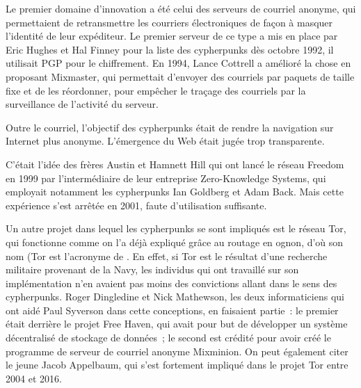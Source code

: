 Le premier domaine d'innovation a été celui des serveurs de courriel anonyme, qui permettaient de retransmettre les courriers électroniques de façon à masquer l'identité de leur expéditeur. Le premier serveur de ce type a mis en place par Eric Hughes et Hal Finney pour la liste des cypherpunks dès octobre 1992, il utilisait PGP pour le chiffrement. En 1994, Lance Cottrell a amélioré la chose en proposant Mixmaster, qui permettait d'envoyer des courriels par paquets de taille fixe et de les réordonner, pour empêcher le traçage des courriels par la surveillance de l'activité du serveur. %

Outre le courriel, l'objectif des cypherpunks était de rendre la navigation sur Internet plus anonyme. L'émergence du Web était jugée trop transparente.

C'était l'idée des frères Austin et Hamnett Hill qui ont lancé le réseau Freedom en 1999 par l'intermédiaire de leur entreprise Zero-Knowledge Systems, qui employait notamment les cypherpunks Ian Goldberg et Adam Back. Mais cette expérience s'est arrêtée en 2001, faute d'utilisation suffisante.

Un autre projet dans lequel les cypherpunks se sont impliqués est le réseau Tor, qui fonctionne comme on l'a déjà expliqué grâce au routage en ognon, d'où son nom (Tor est l'acronyme de . En effet, si Tor est le résultat d'une recherche militaire provenant de la Navy, les individus qui ont travaillé sur son implémentation n'en avaient pas moins des convictions allant dans le sens des cypherpunks. Roger Dingledine et Nick Mathewson, les deux informaticiens qui ont aidé Paul Syverson dans cette conceptions, en faisaient partie~: le premier était derrière le projet Free Haven, qui avait pour but de développer un système décentralisé de stockage de données~; le second est crédité pour avoir créé le programme de serveur de courriel anonyme Mixminion. On peut également citer le jeune Jacob Appelbaum, qui s'est fortement impliqué dans le projet Tor entre 2004 et 2016.

